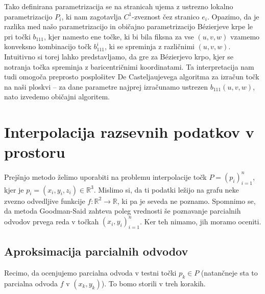 \documentclass[ letterpaper, titlepage, fleqn]{article}
\newcommand{\R}{\mathbb R}
\begin{document}
{Tako definirana parametrizacija se na stranicah ujema z ustrezno lokalno parametrizacijo $P_i$, ki nam zagotavlja $C^1$-zveznost čez stranico $e_i$. Opazimo, da je razlika med našo parametrizacijo in običajno parametrizacijo Bézierjeve krpe le pri točki $b_{111}$, kjer namesto ene točke, ki bi bila fiksna za vse $(u,v,w)$ vzamemo konveksno kombinacijo točk $b_{111}^i$, ki se spreminja z različnimi $(u,v,w)$. Intuitivno si torej lahko predstavljamo, da gre za  Bézierjevo krpo, kjer se notranja točka spreminja z baricentričnimi koordinatami. Ta interpretacija nam tudi omogoča preprosto posplošitev De Casteljaujevega algoritma za izračun točk na naši ploskvi -- za dane parametre najprej izračunamo ustrezen $b_{111}(u,v,w)$, nato izvedemo običajni algoritem.



\section{Interpolacija razsevnih podatkov v prostoru}
Prejšnjo metodo želimo uporabiti na problemu interpolacije točk $P = (p_i)_{i=1}^n$, kjer je $p_i = (x_i,y_i,z_i) \in \R^3$. 
Mislimo si, da ti podatki ležijo na grafu neke zvezno odvedljive funkcije $f \colon \R^2 \to \R$, ki pa je seveda ne poznamo.
Spomnimo se, da metoda Goodman-Said zahteva poleg vrednosti še poznavanje parcialnih odvodov prvega reda v točkah $(x_i,y_i)_{i=1}^n$.
Ker teh nimamo, jih moramo oceniti.

\subsection{Aproksimacija parcialnih odvodov}
Recimo, da ocenjujemo parcialna odvoda v testni točki $p_k \in P$ (natančneje sta to parcialna odvoda $f$ v $(x_k,y_k)$). 
To bomo storili v treh korakih.

}
\end{document}
